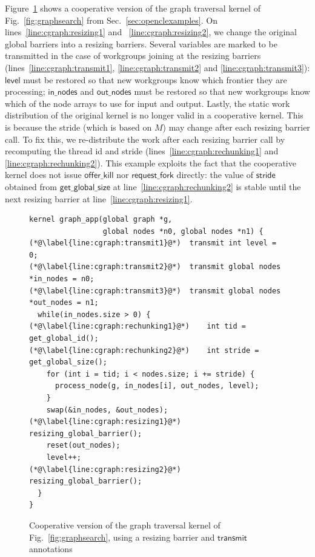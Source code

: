 \documentclass[parskip=half,sigconf,review, anonymous=true, acmcopyrightmode=none]{acmart}
\newcommand{\myfig}{Fig.~}
\newcommand{\myfiglong}{Figure~}
\newcommand{\mysec}{Sec.~}
\newcommand{\transmit}{\mathsf{transmit}}
\newcommand{\offerfork}{\mathsf{request\_fork}}
\newcommand{\offerkill}{\mathsf{offer\_kill}}
\newcommand{\getglobalsize}{\mathsf{get\_global\_size}}
\newcommand{\keyword}[1]{\mathsf{#1}}
\begin{document}
\myfiglong\ref{fig:cgraphsearch} shows a cooperative version of the
graph traversal kernel of \myfig\ref{fig:graphsearch} from
\mysec\ref{sec:openclexamples}.  On lines~\ref{line:cgraph:resizing1}
and ~\ref{line:cgraph:resizing2}, we change the original global
barriers into a resizing barriers. Several variables are marked to be
transmitted in the case of workgroups joining at the resizing barriers
(lines~\ref{line:cgraph:transmit1}, \ref{line:cgraph:transmit2} and
\ref{line:cgraph:transmit3}): $\keyword{level}$ must be restored so
that new workgroups know which frontier they are processing;
$\keyword{in\_nodes}$ and $\keyword{out\_nodes}$ must be restored so
that new workgroups know which of the node arrays to use for input and
output. Lastly, the static work distribution of the original kernel is
no longer valid in a cooperative kernel. This is because the stride
(which is based on $M$) may change after each resizing barrier
call. To fix this, we re-distribute the work after each resizing
barrier call by recomputing the thread id and stride
(lines~\ref{line:cgraph:rechunking1} and
\ref{line:cgraph:rechunking2}). This example exploits the fact that
the cooperative kernel does not issue $\offerkill$ nor $\offerfork$
directly: the value of $\keyword{stride}$ obtained from
$\getglobalsize$ at line~\ref{line:cgraph:rechunking2} is stable
until the next resizing barrier at line~\ref{line:cgraph:resizing1}.

\begin{figure}

\begin{lstlisting}
kernel graph_app(global graph *g,
                 global nodes *n0, global nodes *n1) {
(*@\label{line:cgraph:transmit1}@*)  transmit int level = 0;
(*@\label{line:cgraph:transmit2}@*)  transmit global nodes *in_nodes = n0;
(*@\label{line:cgraph:transmit3}@*)  transmit global nodes *out_nodes = n1;
  while(in_nodes.size > 0) {
(*@\label{line:cgraph:rechunking1}@*)    int tid = get_global_id();
(*@\label{line:cgraph:rechunking2}@*)    int stride = get_global_size();
    for (int i = tid; i < nodes.size; i += stride) {
      process_node(g, in_nodes[i], out_nodes, level);
    }
    swap(&in_nodes, &out_nodes);
(*@\label{line:cgraph:resizing1}@*)    resizing_global_barrier();
    reset(out_nodes);
    level++;
(*@\label{line:cgraph:resizing2}@*)    resizing_global_barrier();
  }
}
\end{lstlisting}
\caption{Cooperative version of the graph traversal kernel of \myfig\ref{fig:graphsearch}, using a resizing barrier and $\transmit$ annotations}\label{fig:cgraphsearch}
\vspace{-4mm}
\end{figure}
\end{document}
